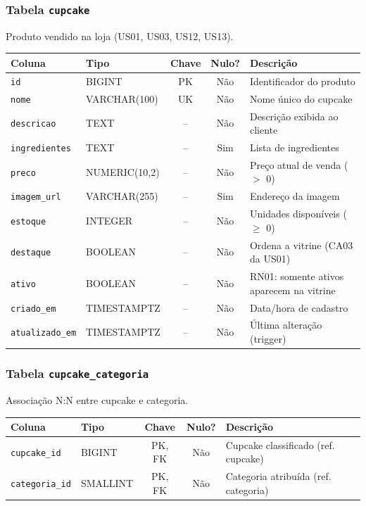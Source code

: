 \subsubsection{Tabela \texttt{cupcake}}
\noindent Produto vendido na loja (US01, US03, US12, US13).\par\smallskip
\begingroup\footnotesize\renewcommand{\arraystretch}{1.2}
\begin{longtable}{|p{3.0cm}|p{2.6cm}|c|c|p{5.6cm}|}
\hline
\rowcolor{gray!40}\textbf{Coluna} & \textbf{Tipo} & \textbf{Chave} & \textbf{Nulo?} & \textbf{Descrição} \\ \hline
\endhead
\texttt{id} & BIGINT & PK & Não & Identificador do produto \\ \hline
\texttt{nome} & VARCHAR(100) & UK & Não & Nome único do cupcake \\ \hline
\texttt{descricao} & TEXT & -- & Não & Descrição exibida ao cliente \\ \hline
\texttt{ingredientes} & TEXT & -- & Sim & Lista de ingredientes \\ \hline
\texttt{preco} & NUMERIC(10,2) & -- & Não & Preço atual de venda ($>$ 0) \\ \hline
\texttt{imagem\_url} & VARCHAR(255) & -- & Sim & Endereço da imagem \\ \hline
\texttt{estoque} & INTEGER & -- & Não & Unidades disponíveis ($\geq$ 0) \\ \hline
\texttt{destaque} & BOOLEAN & -- & Não & Ordena a vitrine (CA03 da US01) \\ \hline
\texttt{ativo} & BOOLEAN & -- & Não & RN01: somente ativos aparecem na vitrine \\ \hline
\texttt{criado\_em} & TIMESTAMPTZ & -- & Não & Data/hora de cadastro \\ \hline
\texttt{atualizado\_em} & TIMESTAMPTZ & -- & Não & Última alteração (trigger) \\ \hline
\end{longtable}
\endgroup
\subsubsection{Tabela \texttt{cupcake\_categoria}}
\noindent Associação N:N entre cupcake e categoria.\par\smallskip
\begingroup\footnotesize\renewcommand{\arraystretch}{1.2}
\begin{longtable}{|p{3.0cm}|p{2.6cm}|c|c|p{5.6cm}|}
\hline
\rowcolor{gray!40}\textbf{Coluna} & \textbf{Tipo} & \textbf{Chave} & \textbf{Nulo?} & \textbf{Descrição} \\ \hline
\endhead
\texttt{cupcake\_id} & BIGINT & PK, FK & Não & Cupcake classificado (ref. cupcake) \\ \hline
\texttt{categoria\_id} & SMALLINT & PK, FK & Não & Categoria atribuída (ref. categoria) \\ \hline
\end{longtable}
\endgroup
